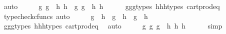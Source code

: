 \begin{isabellebody}
\ auto\isanewline
\ \ \isamarkupfalse%
\ \isamarkupfalse%
\ {\isachardoublequoteopen}{\isasymlangle}g{}{\isacharcomma}{\kern0pt}\ g{}{\isasymrangle}\ {\isacharequal}{\kern0pt}\ {\isasymlangle}h{}{\isacharcomma}{\kern0pt}\ h{}{\isasymrangle}\ {\isasymand}\ {\isasymlangle}g{}{\isacharcomma}{\kern0pt}\ g{}{\isasymrangle}\ {\isacharequal}{\kern0pt}\ {\isasymlangle}h{}{\isacharcomma}{\kern0pt}\ h{}{\isasymrangle}{\isachardoublequoteclose}\isanewline
\ \ \ \ \isamarkupfalse%
\ g{}{\isacharunderscore}{\kern0pt}g{}{\isacharunderscore}{\kern0pt}g{}{\isacharunderscore}{\kern0pt}types\ h{}{\isacharunderscore}{\kern0pt}h{}{\isacharunderscore}{\kern0pt}h{}{\isacharunderscore}{\kern0pt}types\ cart{\isacharunderscore}{\kern0pt}prod{\isacharunderscore}{\kern0pt}eq{}\ \isamarkupfalse%
\ {\isacharparenleft}{\kern0pt}typecheck{\isacharunderscore}{\kern0pt}cfuncs{\isacharcomma}{\kern0pt}\ auto{\isacharparenright}{\kern0pt}\isanewline
\ \ \isamarkupfalse%
\ \isamarkupfalse%
\ {\isachardoublequoteopen}g{}\ {\isacharequal}{\kern0pt}\ h{}\ {\isasymand}\ g{}\ {\isacharequal}{\kern0pt}\ h{}\ {\isasymand}\ g{}\ {\isacharequal}{\kern0pt}\ h{}{\isachardoublequoteclose}\isanewline
\ \ \ \ \isamarkupfalse%
\ g{}{\isacharunderscore}{\kern0pt}g{}{\isacharunderscore}{\kern0pt}g{}{\isacharunderscore}{\kern0pt}types\ h{}{\isacharunderscore}{\kern0pt}h{}{\isacharunderscore}{\kern0pt}h{}{\isacharunderscore}{\kern0pt}types\ cart{\isacharunderscore}{\kern0pt}prod{\isacharunderscore}{\kern0pt}eq{}\ \isamarkupfalse%
\ auto\isanewline
\ \ \isamarkupfalse%
\ \isamarkupfalse%
\ {\isachardoublequoteopen}{\isasymlangle}{\isasymlangle}g{}{\isacharcomma}{\kern0pt}\ g{}{\isasymrangle}{\isacharcomma}{\kern0pt}\ g{}{\isasymrangle}\ {\isacharequal}{\kern0pt}\ {\isasymlangle}{\isasymlangle}h{}{\isacharcomma}{\kern0pt}\ h{}{\isasymrangle}{\isacharcomma}{\kern0pt}\ h{}{\isasymrangle}{\isachardoublequoteclose}\isanewline
\ \ \ \ \isamarkupfalse%
\ simp\isanewline
\ \ \isamarkupfalse%
\ \isamarkupfalse%

\end{isabellebody}
